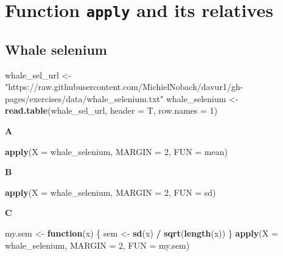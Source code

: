 \documentclass[]{book}
\newenvironment{Shaded}{\begin{snugshade}}{\end{snugshade}}
\newcommand{\ControlFlowTok}[1]{\textcolor[rgb]{0.13,0.29,0.53}{\textbf{#1}}}
\newcommand{\DataTypeTok}[1]{\textcolor[rgb]{0.13,0.29,0.53}{#1}}
\newcommand{\DecValTok}[1]{\textcolor[rgb]{0.00,0.00,0.81}{#1}}
\newcommand{\KeywordTok}[1]{\textcolor[rgb]{0.13,0.29,0.53}{\textbf{#1}}}
\newcommand{\NormalTok}[1]{#1}
\newcommand{\OperatorTok}[1]{\textcolor[rgb]{0.81,0.36,0.00}{\textbf{#1}}}
\newcommand{\StringTok}[1]{\textcolor[rgb]{0.31,0.60,0.02}{#1}}
\begin{document}
\hypertarget{function-apply-and-its-relatives-1}{%
\section{\texorpdfstring{Function \texttt{apply} and its relatives}{Function apply and its relatives}}\label{function-apply-and-its-relatives-1}}

\hypertarget{whale-selenium-1}{%
\subsection{Whale selenium}\label{whale-selenium-1}}

\begin{Shaded}
\begin{Highlighting}[]
\NormalTok{whale_sel_url <-}\StringTok{ "https://raw.githubusercontent.com/MichielNoback/davur1/gh-pages/exercises/data/whale_selenium.txt"}
\NormalTok{whale_selenium <-}\StringTok{ }\KeywordTok{read.table}\NormalTok{(whale_sel_url,}
        \DataTypeTok{header =}\NormalTok{ T,}
        \DataTypeTok{row.names =} \DecValTok{1}\NormalTok{)}
\end{Highlighting}
\end{Shaded}

\textbf{A}

\begin{Shaded}
\begin{Highlighting}[]
\KeywordTok{apply}\NormalTok{(}\DataTypeTok{X =}\NormalTok{ whale_selenium, }\DataTypeTok{MARGIN =} \DecValTok{2}\NormalTok{, }\DataTypeTok{FUN =}\NormalTok{ mean)}
\end{Highlighting}
\end{Shaded}

\textbf{B}

\begin{Shaded}
\begin{Highlighting}[]
\KeywordTok{apply}\NormalTok{(}\DataTypeTok{X =}\NormalTok{ whale_selenium, }\DataTypeTok{MARGIN =} \DecValTok{2}\NormalTok{, }\DataTypeTok{FUN =}\NormalTok{ sd)}
\end{Highlighting}
\end{Shaded}

\textbf{C}

\begin{Shaded}
\begin{Highlighting}[]
\NormalTok{my.sem <-}\StringTok{ }\ControlFlowTok{function}\NormalTok{(x) \{}
\NormalTok{        sem <-}\StringTok{ }\KeywordTok{sd}\NormalTok{(x) }\OperatorTok{/}\StringTok{ }\KeywordTok{sqrt}\NormalTok{(}\KeywordTok{length}\NormalTok{(x))}
\NormalTok{\}}
\KeywordTok{apply}\NormalTok{(}\DataTypeTok{X =}\NormalTok{ whale_selenium, }\DataTypeTok{MARGIN =} \DecValTok{2}\NormalTok{, }\DataTypeTok{FUN =}\NormalTok{ my.sem)}
\end{Highlighting}
\end{Shaded}
\end{document}
